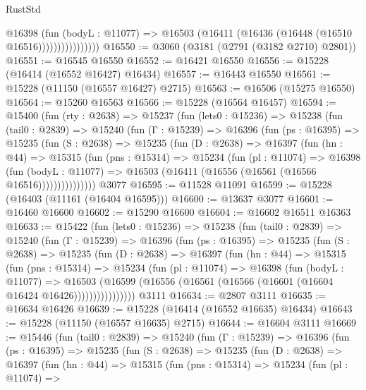 \begin{lexlean}{RustStd}
\begin{coremodule}
                        @16398
                          (fun (bodyL : @11077) =>
                          @16503 (@16411 (@16436 (@16448 (@16510 @16516))))))))))))))))
@16550 := @3060 (@3181 (@2791 (@3182 @2710) @2801))
@16551 := @16545 @16550
@16552 := @16421 @16550
@16556 := @15228 (@16414 (@16552 @16427) @16434)
@16557 := @16443 @16550
@16561 := @15228 (@11150 (@16557 @16427) @2715)
@16563 := @16506 (@15275 @16550)
@16564 := @15260 @16563
@16566 := @15228 (@16564 @16457)
@16594 := @15400
    (fun (rty : @2638) =>
    @15237
      (fun (lets0 : @15236) =>
      @15238
        (fun (tail0 : @2839) =>
        @15240
          (fun (Γ : @15239) =>
          @16396
            (fun (ps : @16395) =>
            @15235
              (fun (S : @2638) =>
              @15235
                (fun (D : @2638) =>
                @16397
                  (fun (hn : @44) =>
                  @15315
                    (fun (pns : @15314) =>
                    @15234
                      (fun (pl : @11074) =>
                      @16398
                        (fun (bodyL : @11077) =>
                        @16503 (@16411 (@16556 (@16561 (@16566 @16516)))))))))))))))
    @3077
@16595 := @11528 @11091
@16599 := @15228 (@16403 (@11161 (@16404 @16595)))
@16600 := @13637 @3077
@16601 := @16460 @16600
@16602 := @15290 @16600
@16604 := @16602 @16511 @16363
@16633 := @15422
    (fun (lets0 : @15236) =>
    @15238
      (fun (tail0 : @2839) =>
      @15240
        (fun (Γ : @15239) =>
        @16396
          (fun (ps : @16395) =>
          @15235
            (fun (S : @2638) =>
            @15235
              (fun (D : @2638) =>
              @16397
                (fun (hn : @44) =>
                @15315
                  (fun (pns : @15314) =>
                  @15234
                    (fun (pl : @11074) =>
                    @16398
                      (fun (bodyL : @11077) =>
                      @16503
                        (@16599
                          (@16556 (@16561 (@16566 (@16601 (@16604 @16424 @16426))))))))))))))))
    @3111
@16634 := @2807 @3111
@16635 := @16634 @16426
@16639 := @15228 (@16414 (@16552 @16635) @16434)
@16643 := @15228 (@11150 (@16557 @16635) @2715)
@16644 := @16604 @3111
@16669 := @15446
    (fun (tail0 : @2839) =>
    @15240
      (fun (Γ : @15239) =>
      @16396
        (fun (ps : @16395) =>
        @15235
          (fun (S : @2638) =>
          @15235
            (fun (D : @2638) =>
            @16397
              (fun (hn : @44) =>
              @15315
                (fun (pns : @15314) =>
                @15234
                  (fun (pl : @11074) =>

\end{coremodule}
\end{lexlean}

